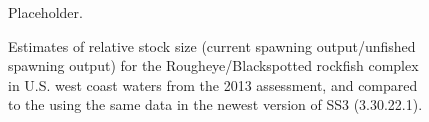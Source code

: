 \documentclass[
]{scrartcl}
\begin{document}
\begin{figure}[H]


\caption{\label{fig-maturity_age_both}Placeholder.}

\end{figure}%

\begin{figure}[H]


\caption{\label{fig-RSS_2013}Estimates of relative stock size (current
spawning output/unfished spawning output) for the Rougheye/Blackspotted
rockfish complex in U.S. west coast waters from the 2013 assessment, and
compared to the using the same data in the newest version of SS3
(3.30.22.1).}

\end{figure}%
\end{document}
